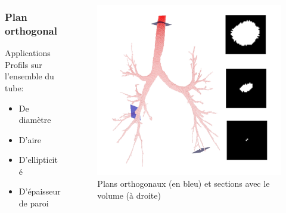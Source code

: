 \documentclass{beamer}
\begin{document}
\begin{frame}
	\begin{columns}
		\begin{column}[t]{4cm}
			\frametitle{Plan orthogonal}
										
			\begin{block}{Applications}
				Profils sur l'ensemble du tube:
				\begin{itemize}
					\item De diamètre
					\item D'aire
					\item D'ellipticité
					\item D'épaisseur de paroi
				\end{itemize}
			\end{block}
		\end{column}
							
		\begin{column}[t]{6cm}
		\vspace{-0.4cm}
			\begin{figure}
				\includegraphics[width=\textwidth]{fig/skeletonPlane.png}
				\caption{Plans orthogonaux (en bleu) et sections avec le volume (à droite)}
			\end{figure}
		\end{column}
	\end{columns}
\end{frame}
\end{document}
